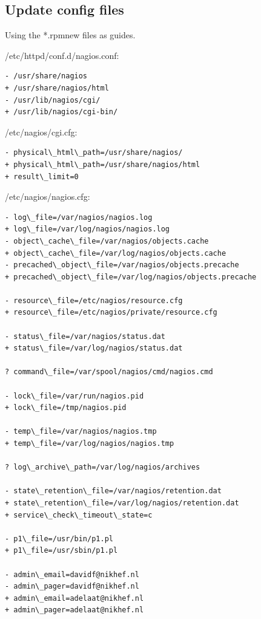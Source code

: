 \documentclass[a4paper,11pt,english]{sphinxmanual}
\begin{document}
\subsection{Update config files}
\label{nagios:update-config-files}
Using the *.rpmnew files as guides.

/etc/httpd/conf.d/nagios.conf:

\begin{Verbatim}[commandchars=\\\{\}]
- /usr/share/nagios
+ /usr/share/nagios/html
- /usr/lib/nagios/cgi/
+ /usr/lib/nagios/cgi-bin/
\end{Verbatim}

/etc/nagios/cgi.cfg:

\begin{Verbatim}[commandchars=\\\{\}]
- physical\_html\_path=/usr/share/nagios/
+ physical\_html\_path=/usr/share/nagios/html
+ result\_limit=0
\end{Verbatim}

/etc/nagios/nagios.cfg:

\begin{Verbatim}[commandchars=\\\{\}]
- log\_file=/var/nagios/nagios.log
+ log\_file=/var/log/nagios/nagios.log
- object\_cache\_file=/var/nagios/objects.cache
+ object\_cache\_file=/var/log/nagios/objects.cache
- precached\_object\_file=/var/nagios/objects.precache
+ precached\_object\_file=/var/log/nagios/objects.precache

- resource\_file=/etc/nagios/resource.cfg
+ resource\_file=/etc/nagios/private/resource.cfg

- status\_file=/var/nagios/status.dat
+ status\_file=/var/log/nagios/status.dat

? command\_file=/var/spool/nagios/cmd/nagios.cmd

- lock\_file=/var/run/nagios.pid
+ lock\_file=/tmp/nagios.pid

- temp\_file=/var/nagios/nagios.tmp
+ temp\_file=/var/log/nagios/nagios.tmp

? log\_archive\_path=/var/log/nagios/archives

- state\_retention\_file=/var/nagios/retention.dat
+ state\_retention\_file=/var/log/nagios/retention.dat
+ service\_check\_timeout\_state=c

- p1\_file=/usr/bin/p1.pl
+ p1\_file=/usr/sbin/p1.pl

- admin\_email=davidf@nikhef.nl
- admin\_pager=davidf@nikhef.nl
+ admin\_email=adelaat@nikhef.nl
+ admin\_pager=adelaat@nikhef.nl
\end{Verbatim}
\end{document}
